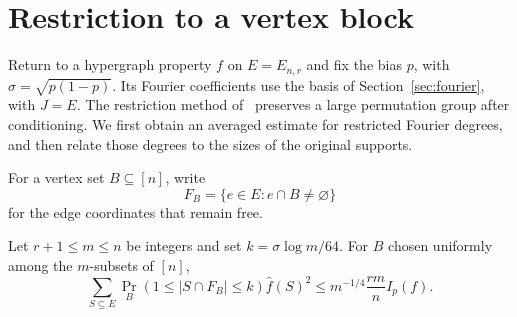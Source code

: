\section{Restriction to a vertex block}
\label{sec:restriction}

Return to a hypergraph property $f$ on $E=E_{n,r}$ and fix the bias
$p$, with $\sigma=\sqrt{p(1-p)}$. Its Fourier coefficients use the basis of
Section~\ref{sec:fourier}, with $J=E$.
The restriction method of~\cite[Lemma~3.1 and Proposition~3.2]{Graph2026} preserves a
large permutation group after conditioning. We first obtain an
averaged estimate for restricted Fourier degrees, and then relate
those degrees to the sizes of the original supports.

For a vertex set $B\subseteq[n]$, write
\[
 F_B=\{e\in E:e\cap B\ne\varnothing\}
\]
for the edge coordinates that remain free.

\begin{lemma}\label{lem:block}
Let $r+1\le m\le n$ be integers and set $k=\sigma\log m/64$.
For $B$ chosen uniformly among the $m$-subsets of $[n]$,
\begin{equation}\label{eq:block}
 \sum_{S\subseteq E}
 \Pr_B(1\le|S\cap F_B|\le k)\widehat f(S)^2
 \le m^{-1/4}\frac{rm}{n}I_p(f).
\end{equation}
\end{lemma}

